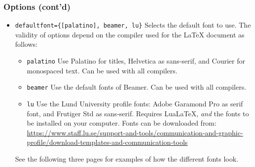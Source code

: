 \documentclass[aspectratio=1610]{beamer}
\begin{document}
\begin{frame}
	\frametitle{Options (cont'd)}
	\begin{itemize}
		\item \texttt{defaultfont=\{[palatino], beamer, lu\}}\newline
		Selects the default font to use. The validity of options depend on the compiler used for the \LaTeX{} document as follows:
		\begin{itemize}
			\item \texttt{palatino}\newline
			Use Palatino for titles, Helvetica as sans-serif, and Courier for monospaced text. Can be used with all compilers.
			\item \texttt{beamer}\newline
			Use the default fonts of Beamer. Can be used with all compilers.
			\item \texttt{lu}\newline
			Use the Lund University profile fonts: Adobe Garamond Pro as serif font, and Frutiger Std as sans-serif. Requires LuaLaTeX, \emph{and} the fonts to be installed on your computer. Fonts can be downloaded from: \url{https://www.staff.lu.se/support-and-tools/communication-and-graphic-profile/download-templates-and-communication-tools}
		\end{itemize}
		See the following three pages for examples of how the different fonts look.
	\end{itemize}
\end{frame}

{
	
}

{
	
}

{
	
}
\end{document}
